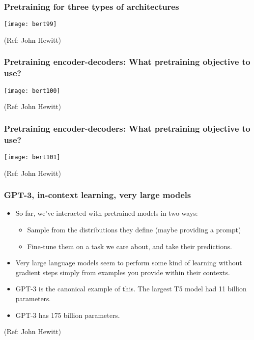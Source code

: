 \begin{frame}[fragile]\frametitle{Pretraining for three types of architectures}

			
			\begin{center}
			\texttt{[image: bert99]}
			\end{center}		
			
			{\tiny (Ref: John Hewitt)}

\end{frame}

\begin{frame}[fragile]\frametitle{Pretraining encoder-decoders: What pretraining objective to use?}

			
			\begin{center}
			\texttt{[image: bert100]}
			\end{center}		
			
			{\tiny (Ref: John Hewitt)}

\end{frame}

\begin{frame}[fragile]\frametitle{Pretraining encoder-decoders: What pretraining objective to use?}

			
			\begin{center}
			\texttt{[image: bert101]}
			\end{center}		
			
			{\tiny (Ref: John Hewitt)}

\end{frame}

\begin{frame}[fragile]\frametitle{GPT-3, in-context learning, very large models}


      \begin{itemize}
			\item So far, we’ve interacted with pretrained models in two ways:
			      \begin{itemize}
						\item Sample from the distributions they define (maybe providing a prompt)
						\item Fine-tune them on a task we care about, and take their predictions.
						\end{itemize}
			\item Very large language models seem to perform some kind of learning without gradient  steps simply from examples you provide within their contexts.
			\item GPT-3 is the canonical example of this. The largest T5 model had 11 billion parameters.
			\item GPT-3 has 175 billion parameters.

			\end{itemize}

			{\tiny (Ref: John Hewitt)}

\end{frame}

